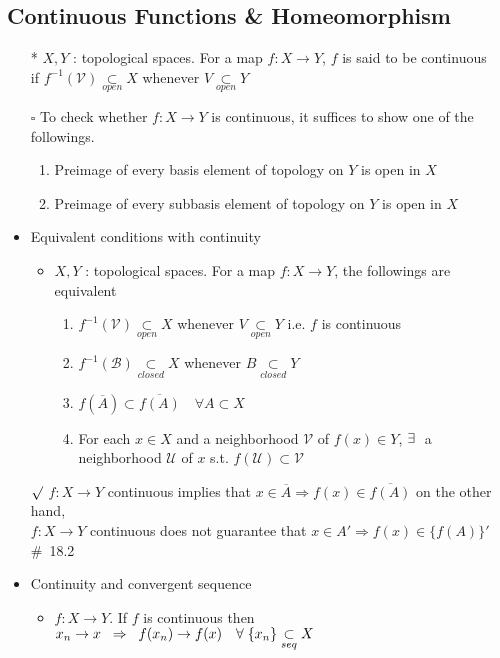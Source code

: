 \documentclass[12pt]{article}
\newcommand{\sq}{$\square$}
\newcommand{\sptwo}{\hspace{0.2cm}}
\newcommand{\spone}{\hspace{0.1cm}}
\newcommand{\open}{\underset{open}{\subset}}
\newcommand{\closed}{\underset{closed}{\subset}}
\newcommand{\seq}{\underset{seq}{\subset}}
\newcommand{\cl}{\overline}
\newcommand{\exist}{\exists\spone}
\begin{document}
\subsection{Continuous Functions \& Homeomorphism}
\smallskip
\begin{itemize}
	\item[*] $X, Y$ : topological spaces. For a map $f : X\rightarrow Y$, $f$ is said to be continuous\\ if $f^{-1}(\mathcal{V})\open X$ whenever $V\open Y$
	\item[\sq] To check whether $f : X\rightarrow Y$ is continuous, it suffices to show one of the followings.
	\begin{enumerate}
		\item Preimage of every basis element of topology on $Y$ is open in $X$
		\item Preimage of every subbasis element of topology on $Y$ is open in $X$ 
	\end{enumerate}
	\item Equivalent conditions with continuity
	\begin{itemize}
		\item $X, Y$ : topological spaces. For a map $f : X\rightarrow Y$, the followings are equivalent
		\begin{enumerate}
			\item $f^{-1}(\mathcal{V})\open X$ whenever $V\open Y$ \quad i.e. \sptwo $f$ is continuous
			\item $f^{-1}(\mathcal{B})\closed X$ whenever $B\closed Y$
			\item $f(\cl{A})\subset \cl{f(A)} \quad \forall A\subset X$
			\item For each $x\in X$ and a neighborhood $\mathcal{V}$ of $f(x)\in Y$, $\exist$ a neighborhood $\mathcal{U}$ of $x$ s.t. $f(\mathcal{U})\subset \mathcal{V}$
		\end{enumerate}
	\end{itemize}
	\item[$\surd$] $f : X\rightarrow Y$ continuous implies that $x\in \cl{A} \Rightarrow f(x)\in \cl{f(A)}$ \quad on the other hand,\\
	$f : X\rightarrow Y$ continuous does not guarantee that $x\in A' \Rightarrow f(x)\in \{f(A)\}'$\quad \#\ 18.2
	\item Continuity and convergent sequence
	\begin{itemize}
		\item $f : X\rightarrow Y$. \sptwo If $f$ is continuous then $x_n\rightarrow x \sptwo \Rightarrow \sptwo f(x_n)\rightarrow f(x) \quad \forall \spone \{x_n\}\seq X$ 

\end{itemize}
\end{itemize}
\end{document}
